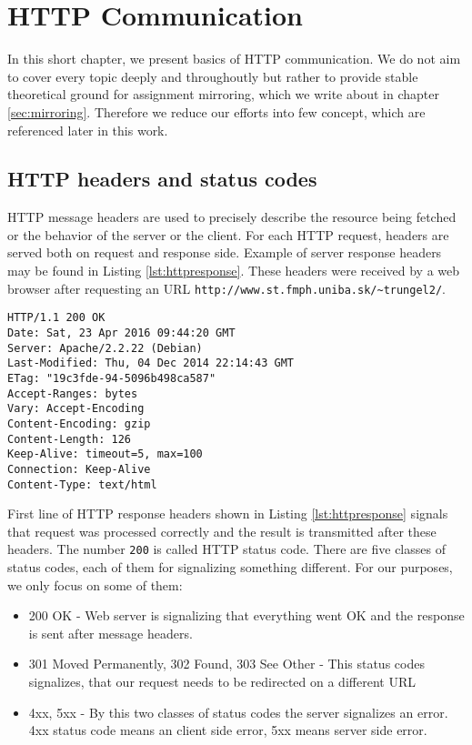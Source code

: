 \chapter{HTTP Communication}

In this short chapter, we present basics of HTTP communication. We do not aim to cover every topic deeply and throughoutly but rather to provide stable theoretical ground for assignment mirroring, which we write about in chapter \ref{sec:mirroring}.
Therefore we reduce our efforts into few  concept, which are referenced later in this work.

\section{HTTP headers and status codes}
HTTP message headers are used to precisely describe the resource being fetched or the behavior of the server or the client. \cite{mozzila} For each HTTP request, headers are served both on request and response side. Example of server response headers may be found in Listing \ref{lst:httpresponse}. These headers were received by a web browser after requesting an URL \texttt{http://www.st.fmph.uniba.sk/\textasciitilde trungel2/}.

\begin{lstlisting}[caption={Http response headers},label={lst:httpresponse}]
HTTP/1.1 200 OK
Date: Sat, 23 Apr 2016 09:44:20 GMT
Server: Apache/2.2.22 (Debian)
Last-Modified: Thu, 04 Dec 2014 22:14:43 GMT
ETag: "19c3fde-94-5096b498ca587"
Accept-Ranges: bytes
Vary: Accept-Encoding
Content-Encoding: gzip
Content-Length: 126
Keep-Alive: timeout=5, max=100
Connection: Keep-Alive
Content-Type: text/html
\end{lstlisting}

First line of HTTP response headers shown in Listing \ref{lst:httpresponse} signals that request was processed correctly and the result is transmitted after these headers. The number \texttt{200} is called HTTP status code. There are five classes of status codes, each of them for signalizing something different. For our purposes, we only focus on some of them:

\begin{itemize}
\item 200 OK - Web server is signalizing that everything went OK and the response is sent after message headers.
\item 301 Moved Permanently, 302 Found, 303 See Other - This status codes signalizes, that our request needs to be redirected on a different URL
\item 4xx, 5xx - By this two classes of status codes the server signalizes an error. 4xx status code means an client side error, 5xx means server side error.
\end{itemize} 

